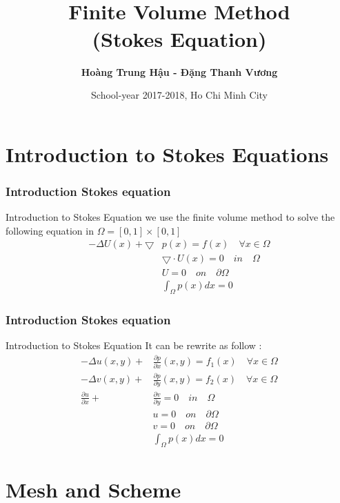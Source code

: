 \documentclass[11pt]{beamer}
\title[Finite Volume Method]{  \\{\bf\huge Finite Volume Method}\\(Stokes Equation)}   %
\author{\bf Hoàng Trung Hậu - Đặng Thanh Vương}                 %
\institute{\large \textcolor{red}{Finite Volume Method} } %
\date{ School-year 2017-2018, Ho Chi Minh City}
\numberwithin{equation}{section}
\theoremstyle{plain}
\theoremstyle{definition}
\theoremstyle{remark}
\begin{document}
\section{Introduction to Stokes Equations}

\begin{frame}
  \titlepage
\end{frame}

\begin{frame}\frametitle{Introduction Stokes equation}
\begin{block}{Introduction to Stokes Equation}
we use the finite volume method to solve the following equation in $\Omega = [0,1] \times [0,1]$
\begin{align*}
- \Delta U(x) + \bigtriangledown & p(x)=f(x) \quad \forall x\in \Omega \\
& \bigtriangledown \cdot U(x) = 0 \quad in \quad \Omega \\
& U=0 \quad on \quad \partial \Omega \\
& \int_{\Omega}p(x)dx=0
\end{align*}
\end{block}
\end{frame}
\begin{frame}\frametitle{Introduction Stokes equation}
\begin{block}{Introduction to Stokes Equation}
It can be rewrite as follow :
\begin{align}
- \Delta u(x,y) +& \frac{\partial p}{\partial x}  (x,y)=f_1(x) \quad \forall x\in \Omega \label{1.1} \\
- \Delta v(x,y) +& \frac{\partial p}{\partial y}  (x,y)=f_2(x) \quad \forall x\in \Omega \\
 \frac{\partial u}{\partial x}+& \frac{\partial v}{\partial y} = 0 \quad in \quad \Omega \\
& u=0 \quad on \quad \partial \Omega \\
& v=0 \quad on \quad \partial \Omega \\
& \int_{\Omega}p(x)dx=0
\end{align}
\end{block} 
\end{frame}

\section{Mesh and Scheme}
\end{document}
